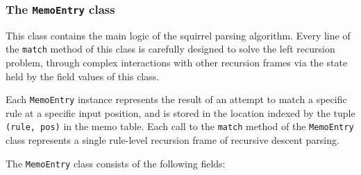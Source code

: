 \documentclass[manuscript]{acmart}
\begin{document}
\subsubsection{The \texttt{MemoEntry} class} This class contains the main logic of the squirrel parsing algorithm. Every line of the \texttt{match} method of this class is carefully designed to solve the left recursion problem, through complex interactions with other recursion frames via the state held by the field values of this class.

Each \texttt{MemoEntry} instance represents the result of an attempt to match a specific rule at a specific input position, and is stored in the location indexed by the tuple \texttt{(rule, pos)} in the memo table. Each call to the \texttt{match} method of the \texttt{MemoEntry} class represents a single rule-level recursion frame of recursive descent parsing.

The \texttt{MemoEntry} class consists of the following fields:
\end{document}
